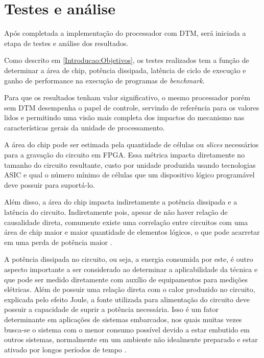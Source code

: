 \section{Testes e análise}
\label{Metodologia:Analise}

Após completada a implementação do processador com DTM, será iniciada a etapa de testes e análise dos resultados. 


Como descrito em \ref{Introducao:Objetivos}, os testes realizados tem a função de determinar a área de chip, potência dissipada, latência de ciclo de execução e ganho de performance na execução de programas de \textit{benchmark}. %

Para que os resultados tenham valor significativo, o mesmo processador porém sem DTM desempenha o papel de controle, servindo de referência para os valores lidos e permitindo uma visão mais completa dos impactos do mecanismo nas características gerais da unidade de processamento.

A área do chip pode ser estimada pela quantidade de células ou \textit{slices} necessários para a gravação do circuito em FPGA. Essa métrica impacta diretamente no tamanho do circuito resultante, custo por unidade produzida usando tecnologias ASIC e qual o número mínimo de células que um dispositivo lógico programável deve possuir para suportá-lo.

Além disso, a área do chip impacta indiretamente a potência dissipada e a latência do circuito. Indiretamente pois, apesar de não haver relação de causalidade direta, comumente existe uma correlação entre circuitos com uma área de chip maior e maior quantidade de elementos lógicos, o que pode acarretar em uma perda de potência maior \cite{chu2006rtl}.

A potência dissipada no circuito, ou seja, a energia consumida por este, é outro aspecto importante a ser considerado ao determinar a aplicabilidade da técnica e que pode ser medido diretamente com auxílio de equipamentos para medições elétricas. Além de possuir uma relação direta com o calor produzido no circuito, explicada pelo efeito Joule, a fonte utilizada para alimentação do circuito deve possuir a capacidade de suprir a potência necessária. Isso é um fator determinante em aplicações de sistemas embarcados, nos quais muitas vezes busca-se o sistema com o menor consumo possível devido a estar embutido em outros sistemas, normalmente em um ambiente não idealmente preparado e estar ativado por longos períodos de tempo \cite{tanenbaum2009organizacao}.

